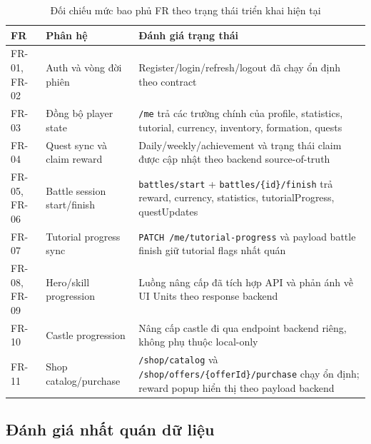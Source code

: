 \begin{table}[H]
\centering
\renewcommand{\arraystretch}{1.2}
\setlength{\tabcolsep}{6pt}
\begin{tabularx}{\textwidth}{|L{2.1cm}|L{4.4cm}|Y|}
\hline
\textbf{FR} & \textbf{Phân hệ} & \textbf{Đánh giá trạng thái} \\
\hline
FR-01, FR-02 & Auth và vòng đời phiên & Register/\allowbreak login/\allowbreak refresh/\allowbreak logout đã chạy ổn định theo contract \\
\hline
FR-03 & Đồng bộ player state & \texttt{/me} trả các trường chính của profile, statistics, tutorial, currency, inventory, formation, quests \\
\hline
FR-04 & Quest sync và claim reward & Daily/\allowbreak weekly/\allowbreak achievement và trạng thái claim được cập nhật theo backend source-of-truth \\
\hline
FR-05, FR-06 & Battle session start/finish & \texttt{battles/start} + \texttt{battles/\{id\}/finish} trả reward, currency, statistics, tutorialProgress, questUpdates \\
\hline
FR-07 & Tutorial progress sync & \texttt{PATCH /me/\allowbreak tutorial-progress} và payload battle finish giữ tutorial flags nhất quán \\
\hline
FR-08, FR-09 & Hero/skill progression & Luồng nâng cấp đã tích hợp API và phản ánh về UI Units theo response backend \\
\hline
FR-10 & Castle progression & Nâng cấp castle đi qua endpoint backend riêng, không phụ thuộc local-only \\
\hline
FR-11 & Shop catalog/purchase & \texttt{/shop/\allowbreak catalog} và \texttt{/shop/\allowbreak offers/\allowbreak \{offerId\}/\allowbreak purchase} chạy ổn định; reward popup hiển thị theo payload backend \\
\hline
\end{tabularx}
\caption{Đối chiếu mức bao phủ FR theo trạng thái triển khai hiện tại}
\label{tab:req-coverage-current}
\end{table}

\subsection{Đánh giá nhất quán dữ liệu}
\label{subsec:eval-consistency}

